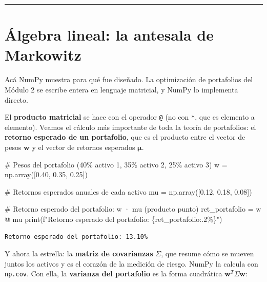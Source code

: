 \documentclass[
  spanish,
  letterpaper,
  DIV=11,
  numbers=noendperiod]{scrreprt}
\newenvironment{Shaded}{\begin{snugshade}}{\end{snugshade}}
\newcommand{\BuiltInTok}[1]{\textcolor[rgb]{0.00,0.23,0.31}{#1}}
\newcommand{\CommentTok}[1]{\textcolor[rgb]{0.37,0.37,0.37}{#1}}
\newcommand{\FloatTok}[1]{\textcolor[rgb]{0.68,0.00,0.00}{#1}}
\newcommand{\NormalTok}[1]{\textcolor[rgb]{0.00,0.23,0.31}{#1}}
\newcommand{\OperatorTok}[1]{\textcolor[rgb]{0.37,0.37,0.37}{#1}}
\newcommand{\SpecialCharTok}[1]{\textcolor[rgb]{0.37,0.37,0.37}{#1}}
\newcommand{\SpecialStringTok}[1]{\textcolor[rgb]{0.13,0.47,0.30}{#1}}
\begin{document}
\begin{center}\rule{0.5\linewidth}{0.5pt}\end{center}

\section{Álgebra lineal: la antesala de
Markowitz}\label{uxe1lgebra-lineal-la-antesala-de-markowitz}

Acá NumPy muestra para qué fue diseñado. La optimización de portafolios
del Módulo 2 se escribe entera en lenguaje matricial, y NumPy lo
implementa directo.

El \textbf{producto matricial} se hace con el operador \texttt{@} (no
con \texttt{*}, que es elemento a elemento). Veamos el cálculo más
importante de toda la teoría de portafolios: el \textbf{retorno esperado
de un portafolio}, que es el producto entre el vector de pesos
\(\mathbf{w}\) y el vector de retornos esperados \(\boldsymbol{\mu}\).

\label{producto-portafolio}
\begin{Shaded}
\begin{Highlighting}[]
\CommentTok{\# Pesos del portafolio (40\% activo 1, 35\% activo 2, 25\% activo 3)}
\NormalTok{w }\OperatorTok{=}\NormalTok{ np.array([}\FloatTok{0.40}\NormalTok{, }\FloatTok{0.35}\NormalTok{, }\FloatTok{0.25}\NormalTok{])}

\CommentTok{\# Retornos esperados anuales de cada activo}
\NormalTok{mu }\OperatorTok{=}\NormalTok{ np.array([}\FloatTok{0.12}\NormalTok{, }\FloatTok{0.18}\NormalTok{, }\FloatTok{0.08}\NormalTok{])}

\CommentTok{\# Retorno esperado del portafolio: w · mu (producto punto)}
\NormalTok{ret\_portafolio }\OperatorTok{=}\NormalTok{ w }\OperatorTok{@}\NormalTok{ mu}
\BuiltInTok{print}\NormalTok{(}\SpecialStringTok{f"Retorno esperado del portafolio: }\SpecialCharTok{\{}\NormalTok{ret\_portafolio}\SpecialCharTok{:.2\%\}}\SpecialStringTok{"}\NormalTok{)}
\end{Highlighting}
\end{Shaded}

\begin{verbatim}
Retorno esperado del portafolio: 13.10%
\end{verbatim}

Y ahora la estrella: la \textbf{matriz de covarianzas} \(\Sigma\), que
resume cómo se mueven juntos los activos y es el corazón de la medición
de riesgo. NumPy la calcula con \texttt{np.cov}. Con ella, la
\textbf{varianza del portafolio} es la forma cuadrática
\(\mathbf{w}^T \Sigma \mathbf{w}\):
\end{document}
